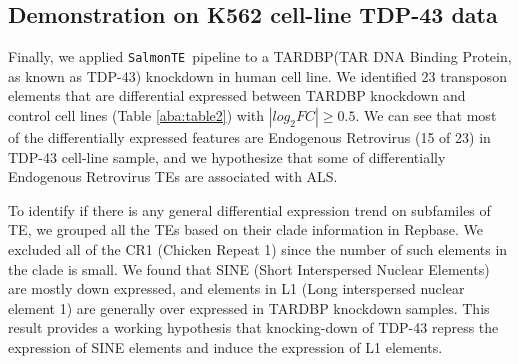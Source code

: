\documentclass{ws-procs11x85}
\newcommand{\SalmonTE}{\texttt{SalmonTE}}
\begin{document}
\subsection{Demonstration on K562 cell-line TDP-43 data}

Finally, we applied \SalmonTE~pipeline to a TARDBP(TAR DNA Binding Protein, as known as TDP-43) knockdown in human cell line. 
We identified 23 transposon elements that are differential expressed between TARDBP knockdown and control cell lines (Table \ref{aba:table2}) with $|log_{2}FC| \geq 0.5$. 
We can see that most of the differentially expressed features are Endogenous Retrovirus (15 of 23) in TDP-43 cell-line sample, and 
we hypothesize that some of differentially Endogenous Retrovirus TEs are associated with ALS.

To identify if there is any general differential expression trend on subfamiles of TE, we grouped all the TEs based on their clade information in Repbase. We excluded all of the CR1 (Chicken Repeat 1) since the number of such elements in the clade is small.
We found that SINE (Short Interspersed Nuclear Elements) are mostly down expressed,
and elements in L1 (Long interspersed nuclear element 1) are generally over expressed in TARDBP knockdown samples. 
This result provides a working hypothesis that knocking-down of TDP-43  repress the expression of SINE elements and induce the expression of L1 elements.
\end{document}
